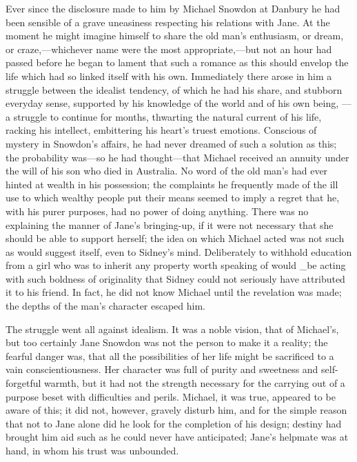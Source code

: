 Ever since the disclosure made to him by Michael Snowdon at Danbury he
had been sensible of a grave uneasiness respecting his relations with
Jane. At the moment he might imagine himself to share the old man's
{\protect\hypertarget{271}{}{}}enthusiasm, or dream, or
craze,---whichever name were the most appropriate,---but not an hour had
passed before he began to lament that such a romance as this should
envelop the life which had so linked itself with his own. Immediately
there arose in him a struggle between the idealist tendency, of which he
had his share, and stubborn everyday sense, supported by his knowledge
of the world and of his own being, --- a struggle to continue for
months, thwarting the natural current of his life, racking his
intellect, embittering his heart's truest emotions. Conscious of mystery
in Snowdon's affairs, he had never dreamed of such a solution as this;
the probability was---so he had thought---that Michael received an
annuity under the will of his son who died in Australia. No word of the
old man's had ever hinted at wealth in his possession; the complaints he
frequently made of the ill use to which wealthy people put their means
seemed to imply a regret that he, with his purer purposes, had no power
of doing anything. There was no explaining the manner of Jane's
{\protect\hypertarget{272}{}{}}bringing-up, if it were not necessary
that she should be able to support herself; the idea on which Michael
acted was not such as would suggest itself, even to Sidney's mind.
Deliberately to withhold education from a girl who was to inherit any
property worth speaking of would \_be acting with such boldness of
originality that Sidney could not seriously have attributed it to his
friend. In fact, he did not know Michael until the revelation was made;
the depths of the man's character escaped him.

The struggle went all against idealism. It was a noble vision, that of
Michael's, but too certainly Jane Snowdon was not the person to make it
a reality; the fearful danger was, that all the possibilities of her
life might be sacrificed to a vain conscientiousness. Her character was
full of purity and sweetness and self-forgetful warmth, but it had not
the strength necessary for the carrying out of a purpose beset with
difficulties and perils. Michael, it was true, appeared to be aware of
this; it did not, however, gravely disturb
{\protect\hypertarget{273}{}{}}him, and for the simple reason that not
to Jane alone did he look for the completion of his design; destiny had
brought him aid such as he could never have anticipated; Jane's helpmate
was at hand, in whom his trust was unbounded.


